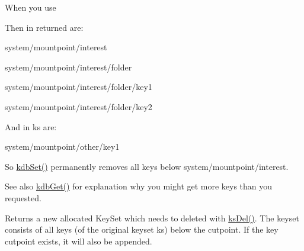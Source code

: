 When you use 
\begin{DoxyCodeInclude}{0}
\end{DoxyCodeInclude}
 Then in {\ttfamily returned} are\+:
\begin{DoxyItemize}
\item {\ttfamily system/mountpoint/interest} 
\item {\ttfamily system/mountpoint/interest/folder} 
\item {\ttfamily system/mountpoint/interest/folder/key1} 
\item {\ttfamily system/mountpoint/interest/folder/key2} 
\end{DoxyItemize}

And in {\ttfamily ks} are\+:
\begin{DoxyItemize}
\item {\ttfamily system/mountpoint/other/key1} 
\end{DoxyItemize}

So \mbox{\hyperlink{group__kdb_ga11436b058408f83d303ca5e996832bcf}{kdb\+Set()}} permanently removes all keys below {\ttfamily system/mountpoint/interest}.

\begin{DoxySeeAlso}{See also}
\mbox{\hyperlink{group__kdb_ga28e385fd9cb7ccfe0b2f1ed2f62453a1}{kdb\+Get()}} for explanation why you might get more keys than you requested.
\end{DoxySeeAlso}
\begin{DoxyReturn}{Returns}
a new allocated Key\+Set which needs to deleted with \mbox{\hyperlink{group__keyset_ga27e5c16473b02a422238c8d970db7ac8}{ks\+Del()}}. The keyset consists of all keys (of the original keyset ks) below the cutpoint. If the key cutpoint exists, it will also be appended. 
\end{DoxyReturn}

